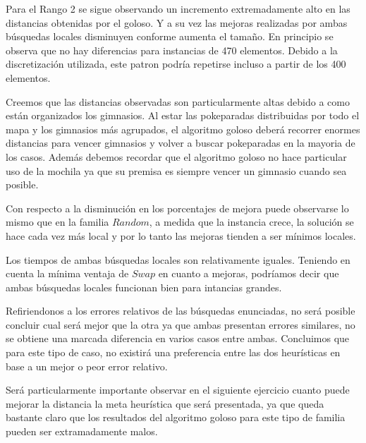  
Para el Rango 2 se sigue observando un incremento extremadamente alto en las distancias obtenidas por el goloso. Y a su vez las mejoras realizadas por ambas búsquedas locales disminuyen conforme aumenta el tamaño. En principio se observa que no hay diferencias para instancias de 470 elementos. Debido a la discretización utilizada, este patron podría repetirse incluso a partir de los 400 elementos.

Creemos que las distancias observadas son particularmente altas debido a como están organizados los gimnasios. Al estar las pokeparadas distribuidas por todo el mapa y los gimnasios más agrupados, el algoritmo goloso deberá recorrer enormes distancias para vencer gimnasios y volver a buscar pokeparadas en la mayoria de los casos. Además debemos recordar que el algoritmo goloso no hace particular uso de la mochila ya que su premisa es siempre vencer un gimnasio cuando sea posible.

Con respecto a la disminución en los porcentajes de mejora puede observarse lo mismo que en la familia $Random$, a medida que la instancia crece, la solución se hace cada vez más local y por lo tanto las mejoras tienden a ser mínimos locales. 

Los tiempos de ambas búsquedas locales son relativamente iguales. Teniendo en cuenta la mínima ventaja de $Swap$ en cuanto a mejoras, podríamos decir que ambas búsquedas locales funcionan bien para intancias grandes.

Refiriendonos a los errores relativos de las búsquedas enunciadas, no ser\'a posible concluir cual ser\'a mejor que la otra ya que ambas presentan errores similares, no se obtiene una marcada diferencia en varios casos entre ambas. Concluimos que para este tipo de caso, no existirá una preferencia entre las dos heurísticas en base a un mejor o peor error relativo.

Será particularmente importante observar en el siguiente ejercicio cuanto puede mejorar la distancia la meta heurística que será presentada, ya que queda bastante claro que los resultados del algoritmo goloso para este tipo de familia pueden ser extramadamente malos. 
\\\\
